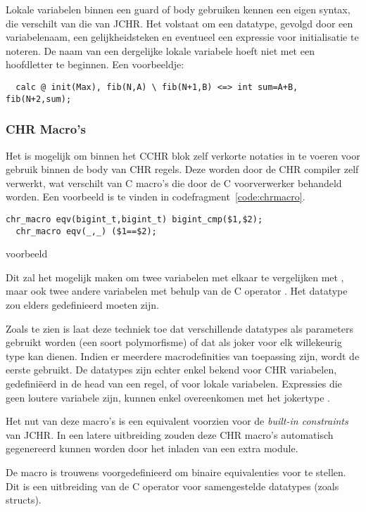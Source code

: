 Lokale variabelen binnen een guard of body gebruiken kennen een eigen syntax, die verschilt van die van JCHR. Het volstaat om een datatype, gevolgd door een variabelenaam, een gelijkheidsteken en eventueel een expressie voor initialisatie te noteren. De naam van een dergelijke lokale variabele hoeft niet met een hoofdletter te beginnen. Een voorbeeldje: \begin{Verbatim}
  calc @ init(Max), fib(N,A) \ fib(N+1,B) <=> int sum=A+B, fib(N+2,sum);
\end{Verbatim}

\subsubsection{CHR Macro's}

Het is mogelijk om binnen het CCHR blok zelf verkorte notaties in te voeren voor gebruik binnen de body van CHR regels. Deze worden door de CHR compiler zelf verwerkt, wat verschilt van C macro's die door de C voorverwerker behandeld worden. Een voorbeeld is te vinden in codefragment~\ref{code:chrmacro}.
\begin{exCode}
\begin{Verbatim}[frame=single]
  chr_macro eqv(bigint_t,bigint_t) bigint_cmp($1,$2);
  chr_macro eqv(_,_) ($1==$2);
\end{Verbatim}
\caption{ voorbeeld}
\label{code:chrmacro}
\end{exCode}
Dit zal het mogelijk maken om twee  variabelen met elkaar te vergelijken met , maar ook twee andere variabelen met behulp van de C operator \code{==}. Het datatype  zou elders gedefinieerd moeten zijn.

Zoals te zien is laat deze techniek toe dat verschillende datatypes als parameters gebruikt worden (een soort polymorfisme) of dat \code{\_} als joker voor elk willekeurig type kan dienen. Indien er meerdere macrodefinities van toepassing zijn, wordt de eerste gebruikt. De datatypes zijn echter enkel bekend voor CHR variabelen, gedefini\"eerd in de head van een regel, of voor lokale variabelen. Expressies die geen loutere variabele zijn, kunnen enkel overeenkomen met het jokertype \code{\_}.

Het nut van deze macro's is een equivalent voorzien voor de {\em built-in constraints} van JCHR. In een latere uitbreiding zouden deze CHR macro's automatisch gegenereerd kunnen worden door het inladen van een extra module.

De macro  is trouwens voorgedefinieerd om binaire equivalenties voor te stellen. Dit is een uitbreiding van de C operator \code{==} voor samengestelde datatypes (zoals structs).

